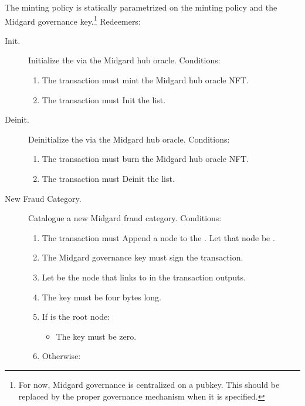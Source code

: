 \documentclass[../midgard.tex]{subfiles}
\begin{document}
The  minting policy is statically parametrized on the  minting policy and the Midgard governance key.\footnote{For now, Midgard governance is centralized on a pubkey.
This should be replaced by the proper governance mechanism when it is specified.} Redeemers:
\begin{description}
    \item[Init.] Initialize the  via the Midgard hub oracle.
      Conditions:
        \begin{enumerate}
            \item The transaction must mint the Midgard hub oracle NFT.
            \item The transaction must Init the  list.
        \end{enumerate}
    \item[Deinit.] Deinitialize the  via the Midgard hub oracle.
      Conditions:
        \begin{enumerate}
            \item The transaction must burn the Midgard hub oracle NFT.
            \item The transaction must Deinit the  list.
        \end{enumerate}
    \item[New Fraud Category.] Catalogue a new Midgard fraud category.
      Conditions:
        \begin{enumerate}
            \item The transaction must Append a node to the .
              Let that node be .
            \item The Midgard governance key must sign the transaction.
            \item Let  be the node that links to  in the transaction outputs.
            \item The  key must be four bytes long.
            \item If  is the root node:
                \begin{itemize}
                    \item The  key must be zero.
                \end{itemize}
            \item Otherwise:
                \begin{itemize}

\end{itemize}
\end{enumerate}
\end{description}
\end{document}

